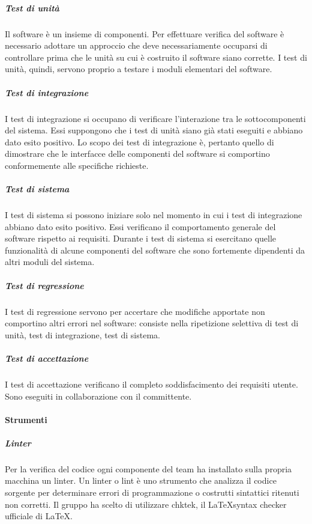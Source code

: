 \documentclass[../norme-di-progetto.tex]{subfiles}
\begin{document}
\subparagraph{Test di unità}%
\label{subp:test di unita}
Il software è un insieme di componenti. Per effettuare verifica del software è necessario adottare un approccio  che deve necessariamente occuparsi di controllare prima che le unità su cui è costruito il software siano corrette. I test di unità, quindi, servono proprio a testare i moduli elementari del software.

\subparagraph{Test di integrazione}%
\label{subp:test di integrazione}
I test di integrazione si occupano di verificare l'interazione tra le sottocomponenti del sistema. Essi suppongono che i test di unità siano già stati eseguiti e abbiano dato esito positivo. Lo scopo dei test di integrazione è, pertanto quello di dimostrare che le interfacce delle componenti del software si comportino conformemente alle specifiche richieste.

\subparagraph{Test di sistema}%
\label{test di sistemaa}
I test di sistema si possono iniziare solo nel momento in cui i test di integrazione abbiano dato esito positivo. Essi verificano il comportamento generale del software rispetto ai requisiti. Durante i test di sistema si esercitano quelle funzionalità di alcune componenti del software che sono fortemente dipendenti da altri moduli del sistema.

\subparagraph{Test di regressione}%
\label{test di regressione}
I test di regressione servono per accertare che modifiche apportate non comportino altri errori nel software: consiste nella ripetizione selettiva di test di unità, test di integrazione, test di sistema.

\subparagraph{Test di accettazione}%
\label{test di accettazione}
I test di accettazione verificano il completo soddisfacimento dei requisiti utente. Sono eseguiti in collaborazione con il committente.

\paragraph{Strumenti}%
\label{par:verifica/descrizione/strumenti}

\subparagraph{Linter}%
\label{subp:linter}

Per la verifica del codice ogni componente del team ha installato sulla propria macchina un linter. Un linter o lint è uno strumento che analizza il codice sorgente per determinare errori di programmazione o costrutti sintattici ritenuti non corretti. Il gruppo ha scelto di utilizzare chktek, il \LaTeX  syntax checker ufficiale di \LaTeX.
\end{document}

